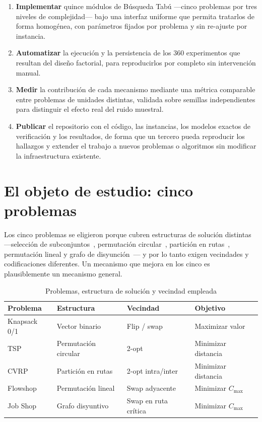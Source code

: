 \begin{enumerate}
  \item \textbf{Implementar} quince módulos de Búsqueda Tabú —cinco problemas
    por tres niveles de complejidad— bajo una interfaz uniforme que permita
    tratarlos de forma homogénea, con parámetros fijados por problema y sin
    re-ajuste por instancia.
  \item \textbf{Automatizar} la ejecución y la persistencia de los 360
    experimentos que resultan del diseño factorial, para reproducirlos por
    completo sin intervención manual.
  \item \textbf{Medir} la contribución de cada mecanismo mediante una métrica
    comparable entre problemas de unidades distintas, validada sobre semillas
    independientes para distinguir el efecto real del ruido muestral.
  \item \textbf{Publicar} el repositorio con el código, las instancias, los
    modelos exactos de verificación y los resultados, de forma que un tercero
    pueda reproducir los hallazgos y extender el trabajo a nuevos problemas o
    algoritmos sin modificar la infraestructura existente.
\end{enumerate}

\section{El objeto de estudio: cinco problemas}

Los cinco problemas se eligieron porque cubren estructuras de solución
distintas —selección de subconjuntos~\cite{martello1990knapsack}, permutación
circular~\cite{applegate2006traveling}, partición en
rutas~\cite{toth2002vehicle}, permutación lineal y grafo de
disyunción~\cite{pinedo2016scheduling}— y por lo tanto exigen vecindades y
codificaciones diferentes. Un mecanismo que mejora en los cinco es
plausiblemente un mecanismo general.

\begin{table}[H]
\centering
\caption{Problemas, estructura de solución y vecindad empleada}
\label{tab:problemas}
\small
\begin{tabular}{llll}
\toprule
\textbf{Problema} & \textbf{Estructura} & \textbf{Vecindad} &
  \textbf{Objetivo} \\
\midrule
Knapsack 0/1 & Vector binario     & Flip / swap       & Maximizar valor \\
TSP          & Permutación circular & 2-opt           & Minimizar distancia \\
CVRP         & Partición en rutas & 2-opt intra/inter & Minimizar distancia \\
Flowshop     & Permutación lineal & Swap adyacente    & Minimizar $C_{\max}$ \\
Job Shop     & Grafo disyuntivo   & Swap en ruta crítica & Minimizar $C_{\max}$ \\
\bottomrule
\end{tabular}
\end{table}

